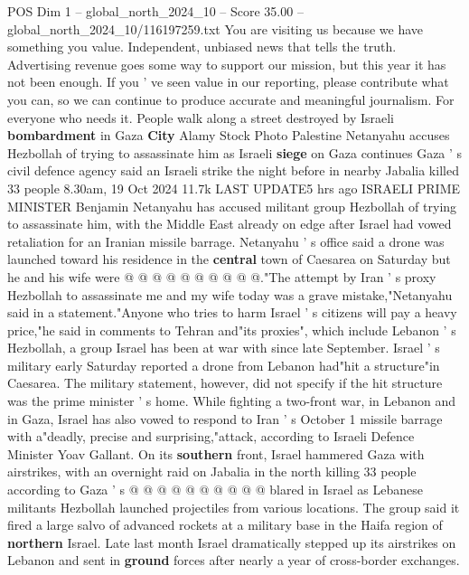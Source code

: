 \begin{textsample}{POS Dim 1 – global\_north\_2024\_10 – Score 35.00 – global\_north\_2024\_10/116197259.txt}  \label{ex:f1_pos_372}
You are visiting us because we have something you value.
Independent, unbiased news that tells the truth.
Advertising revenue goes some way to support our mission, but this year it has not been enough.
If you ' ve seen value in our reporting, please contribute what you can, so we can continue to produce accurate and meaningful journalism.
For everyone who needs it.
People walk along a street destroyed by Israeli \textbf{bombardment} in Gaza \textbf{City} Alamy Stock Photo Palestine Netanyahu accuses Hezbollah of trying to assassinate him as Israeli \textbf{siege} on Gaza continues Gaza ' s civil defence agency said an Israeli strike the night before in nearby Jabalia killed 33 people 8.30am, 19 Oct 2024 11.7k LAST UPDATE5 hrs ago ISRAELI PRIME MINISTER Benjamin Netanyahu has accused militant group Hezbollah of trying to assassinate him, with the Middle East already on edge after Israel had vowed retaliation for an Iranian missile barrage.
Netanyahu ' s office said a drone was launched toward his residence in the \textbf{central} town of Caesarea on Saturday but he and his wife were @ @ @ @ @ @ @ @ @ @."The attempt by Iran ' s proxy Hezbollah to assassinate me and my wife today was a grave mistake,"Netanyahu said in a statement."Anyone who tries to harm Israel ' s citizens will pay a heavy price,"he said in comments to Tehran and"its proxies", which include Lebanon ' s Hezbollah, a group Israel has been at war with since late September.
Israel ' s military early Saturday reported a drone from Lebanon had"hit a structure"in Caesarea.
The military statement, however, did not specify if the hit structure was the prime minister ' s home.
While fighting a two-front war, in Lebanon and in Gaza, Israel has also vowed to respond to Iran ' s October 1 missile barrage with a"deadly, precise and surprising,"attack, according to Israeli Defence Minister Yoav Gallant.
On its \textbf{southern} front, Israel hammered Gaza with airstrikes, with an overnight raid on Jabalia in the north killing 33 people according to Gaza ' s @ @ @ @ @ @ @ @ @ @ blared in Israel as Lebanese militants Hezbollah launched projectiles from various locations.
The group said it fired a large salvo of advanced rockets at a military base in the Haifa region of \textbf{northern} Israel.
Late last month Israel dramatically stepped up its airstrikes on Lebanon and sent in \textbf{ground} forces after nearly a year of cross-border exchanges.

\end{textsample}

